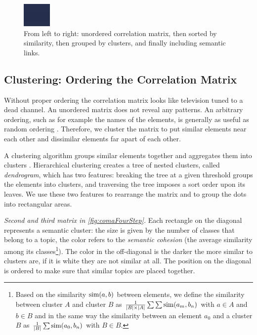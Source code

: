 \begin{figure}[h]
  \includegraphics{clusteringEx}
  \caption{From left to right: unordered correlation matrix, then sorted by similarity, then grouped by clusters, and finally including semantic links.}\label{fig:comaFourStep}
\end{figure}

\subsection{Clustering: Ordering the Correlation Matrix}\label{sec:clustering}


Without proper ordering the correlation matrix looks like television tuned to a dead channel. An unordered matrix does not reveal any patterns. An arbitrary ordering, such as for example the names of the elements, is generally as useful as random ordering \cite{Bert73a}. Therefore, we cluster the matrix to put similar elements near each other and dissimilar elements far apart of each other.

A clustering algorithm groups similar elements together and aggregates them into clusters \cite{Jain99a}. Hierarchical clustering creates a tree of nested clusters, called \emph{dendrogram}, which has two features: breaking the tree at a given threshold groups the elements into clusters, and traversing the tree imposes a sort order upon its leaves. We use these two features to rearrange the matrix and to group the dots into rectangular areas.

\emph{Second and third matrix in \autoref{fig:comaFourStep}.} Each rectangle on the diagonal represents a semantic cluster: the size is given by the number of classes that belong to a topic, the color refers to the \emph{semantic cohesion} \cite{Marc05a} (\ie the average similarity among its classes\footnote{Based on the similarity ${\rm sim}(a,b)$ between elements, we define the similarity between cluster $A$ and cluster $B$ as $\frac{1}{|B| \times |A|}\sum \sum {\rm sim}(a_m,b_n)$ with $a \in A$ and $b \in B$ and in the same way the similarity between an element $a_0$ and a cluster $B$ as $\frac{1}{|B|}\sum {\rm sim}(a_0,b_n)$ with $B \in B$.
}). The color in the off-diagonal is the darker the more similar to clusters are, if it is white they are not similar at all. The position on the diagonal is ordered to make sure that similar topics are placed together.

